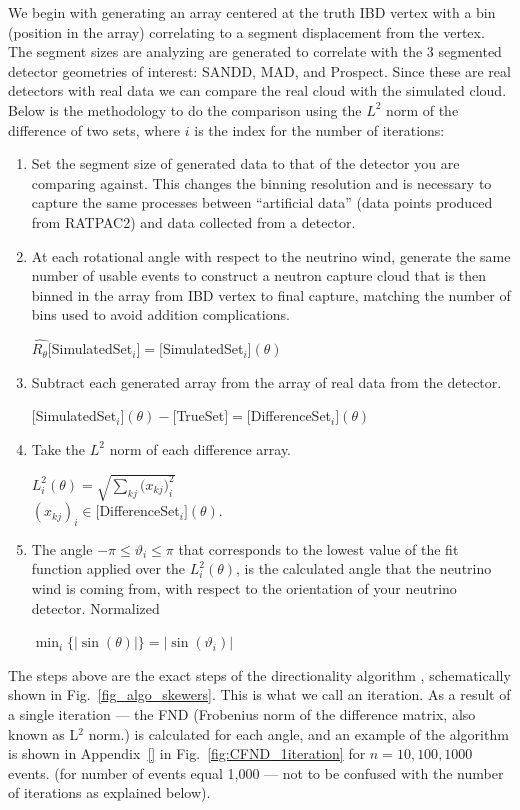 \documentclass[tightenlines,
twocolumn,prl,notitlepage,nofootinbib,preprintnumbers,longbibliography]{revtex4-1}
\begin{document}
We begin with generating an array centered at the truth IBD vertex with a bin (position in the array) correlating to a segment displacement from the vertex. The segment sizes are analyzing are generated to correlate with the 3  segmented detector geometries of interest: SANDD, MAD,  and Prospect. Since these are real detectors with real data we can compare the real cloud with the simulated cloud. Below is the methodology to do the comparison using the $L^2$ norm of the difference of two sets, where $i$ is the index for the number of iterations:
\begin{enumerate}
    \item Set the segment size of generated data to that of the detector you are comparing against. This changes the binning resolution and is necessary to capture the same processes between ``artificial data'' (data points produced from RATPAC2) and data collected from a detector.
    \item At each rotational angle with respect to the neutrino wind, generate the same number of usable events to construct a neutron capture cloud that is then binned in the array from IBD vertex to final capture, matching the number of bins used to avoid addition complications. 
    
    $\hat{R_{\theta}}[$SimulatedSet$_i] = [$SimulatedSet$_i](\theta) $
    \item Subtract each generated array from the array of real data from the detector.

     $[$SimulatedSet$_i](\theta) - [$TrueSet$] = [$DifferenceSet$_i](\theta)$
    \item Take the $L^2$ norm of each difference array. 
    
    $L^2_i(\theta) = \sqrt{\sum_{kj}({x_{kj})_i^2}} $\\$ (x_{kj})_i \in [$DifferenceSet$_i](\theta)$.
    
    \item The angle $-\pi \leq\vartheta_i\leq\pi$ that corresponds to the lowest value of the fit function applied over the $L_i^2(\theta)$, is the calculated angle that the neutrino wind is coming from, with respect to the orientation of your neutrino detector. Normalized
    
    $\min_i\{|\sin{(\theta)}|\} = |\sin{(\vartheta_i)}|$

\end{enumerate}

The steps above are the exact steps of the directionality algorithm \cite{10.1063/5.0315079}, schematically shown in Fig.~\ref{fig_algo_skewers}. This is what we call an iteration. As a result of a single iteration --- the FND (Frobenius norm of the difference matrix, also known as L$^2$ norm.) is calculated for each angle, and an example of the algorithm is shown in Appendix~\ref{} in Fig.~\ref{fig:CFND_1iteration} for $n=10,100,1000$ events. (for number of events equal 1,000 --- not to be confused with the number of iterations as explained below).
\end{document}
